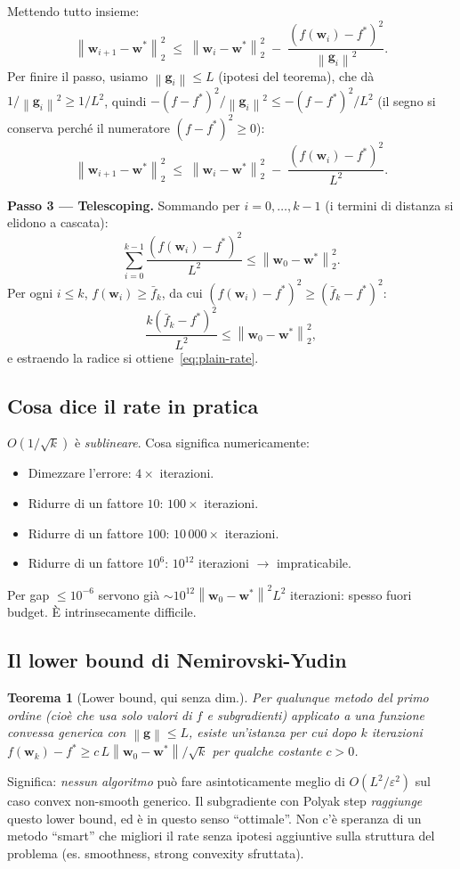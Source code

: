 \documentclass[11pt,a4paper]{article}
\newcommand{\norm}[1]{\left\|#1\right\|}
\newcommand{\bw}{\mathbf{w}}
\newcommand{\bg}{\mathbf{g}}
\newtheorem{theorem}{Teorema}[section]
\theoremstyle{definition}
\begin{document}
\begin{tcolorbox}[proofbox]
\smallskip
Mettendo tutto insieme:
\[
\norm{\bw_{i+1}-\bw^*}_2^2 \;\le\; \norm{\bw_i-\bw^*}_2^2 \;-\; \frac{(f(\bw_i)-f^*)^2}{\norm{\bg_i}^2}.
\]
Per finire il passo, usiamo $\norm{\bg_i}\le L$ (ipotesi del teorema), che dà $1/\norm{\bg_i}^2 \ge 1/L^2$, quindi $-(f-f^*)^2/\norm{\bg_i}^2 \le -(f-f^*)^2/L^2$ (il segno si conserva perché il numeratore $(f-f^*)^2 \ge 0$):
\begin{equation}
\label{eq:perstep-clean}
\norm{\bw_{i+1}-\bw^*}_2^2 \;\le\; \norm{\bw_i-\bw^*}_2^2 \;-\; \frac{(f(\bw_i)-f^*)^2}{L^2}.
\end{equation}

\textbf{Passo 3 — Telescoping.} Sommando per $i=0,\dots,k-1$ (i termini di distanza si elidono a cascata):
\[
\sum_{i=0}^{k-1}\frac{(f(\bw_i)-f^*)^2}{L^2} \le \norm{\bw_0-\bw^*}_2^2.
\]
Per ogni $i\le k$, $f(\bw_i)\ge \bar f_k$, da cui $(f(\bw_i)-f^*)^2\ge(\bar f_k-f^*)^2$:
\[
\frac{k(\bar f_k-f^*)^2}{L^2} \le \norm{\bw_0-\bw^*}_2^2,
\]
e estraendo la radice si ottiene~\eqref{eq:plain-rate}.
\end{tcolorbox}

\subsection{Cosa dice il rate in pratica}

$O(1/\sqrt{k})$ è \emph{sublineare}. Cosa significa numericamente:
\begin{itemize}[leftmargin=*]
\item Dimezzare l'errore: $4\times$ iterazioni.
\item Ridurre di un fattore $10$: $100\times$ iterazioni.
\item Ridurre di un fattore $100$: $10\,000\times$ iterazioni.
\item Ridurre di un fattore $10^6$: $10^{12}$ iterazioni $\to$ impraticabile.
\end{itemize}
Per gap $\le 10^{-6}$ servono già $\sim 10^{12}\norm{\bw_0-\bw^*}^2 L^2$ iterazioni: spesso fuori budget. È intrinsecamente difficile.

\subsection{Il lower bound di Nemirovski-Yudin}

\begin{theorem}[Lower bound, qui senza dim.]
Per qualunque metodo del primo ordine (cioè che usa solo valori di $f$ e subgradienti) applicato a una funzione convessa generica con $\norm{\bg}\le L$, esiste un'istanza per cui dopo $k$ iterazioni $f(\bw_k)-f^* \ge c\,L\norm{\bw_0-\bw^*}/\sqrt{k}$ per qualche costante $c>0$.
\end{theorem}
Significa: \emph{nessun algoritmo} può fare asintoticamente meglio di $O(L^2/\varepsilon^2)$ sul caso convex non-smooth generico. Il subgradiente con Polyak step \emph{raggiunge} questo lower bound, ed è in questo senso ``ottimale''. Non c'è speranza di un metodo ``smart'' che migliori il rate senza ipotesi aggiuntive sulla struttura del problema (es. smoothness, strong convexity sfruttata).
\end{document}
